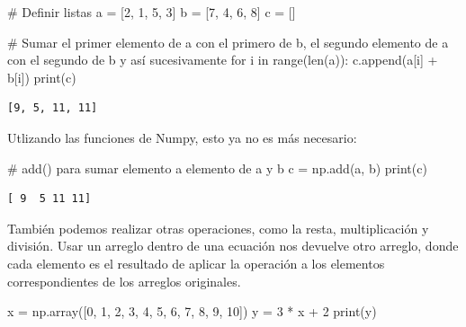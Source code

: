 \documentclass[
  letterpaper,
  DIV=11,
  numbers=noendperiod]{scrreprt}
\newenvironment{Shaded}{\begin{snugshade}}{\end{snugshade}}
\newcommand{\BuiltInTok}[1]{\textcolor[rgb]{0.00,0.23,0.31}{#1}}
\newcommand{\CommentTok}[1]{\textcolor[rgb]{0.37,0.37,0.37}{#1}}
\newcommand{\ControlFlowTok}[1]{\textcolor[rgb]{0.00,0.23,0.31}{#1}}
\newcommand{\DecValTok}[1]{\textcolor[rgb]{0.68,0.00,0.00}{#1}}
\newcommand{\KeywordTok}[1]{\textcolor[rgb]{0.00,0.23,0.31}{#1}}
\newcommand{\NormalTok}[1]{\textcolor[rgb]{0.00,0.23,0.31}{#1}}
\newcommand{\OperatorTok}[1]{\textcolor[rgb]{0.37,0.37,0.37}{#1}}
\begin{document}
\begin{Shaded}
\begin{Highlighting}[]
\CommentTok{\# Definir listas}
\NormalTok{a }\OperatorTok{=}\NormalTok{ [}\DecValTok{2}\NormalTok{, }\DecValTok{1}\NormalTok{, }\DecValTok{5}\NormalTok{, }\DecValTok{3}\NormalTok{]}
\NormalTok{b }\OperatorTok{=}\NormalTok{ [}\DecValTok{7}\NormalTok{, }\DecValTok{4}\NormalTok{, }\DecValTok{6}\NormalTok{, }\DecValTok{8}\NormalTok{]}
\NormalTok{c }\OperatorTok{=}\NormalTok{ []}

\CommentTok{\# Sumar el primer elemento de a con el primero de b, el segundo elemento de a con el segundo de b y así sucesivamente}
\ControlFlowTok{for}\NormalTok{ i }\KeywordTok{in} \BuiltInTok{range}\NormalTok{(}\BuiltInTok{len}\NormalTok{(a)):}
\NormalTok{  c.append(a[i] }\OperatorTok{+}\NormalTok{ b[i])}
\BuiltInTok{print}\NormalTok{(c)}
\end{Highlighting}
\end{Shaded}

\begin{verbatim}
[9, 5, 11, 11]
\end{verbatim}

Utlizando las funciones de Numpy, esto ya no es más necesario:

\begin{Shaded}
\begin{Highlighting}[]
\CommentTok{\# add() para sumar elemento a elemento de a y b}
\NormalTok{c }\OperatorTok{=}\NormalTok{ np.add(a, b)}
\BuiltInTok{print}\NormalTok{(c)}
\end{Highlighting}
\end{Shaded}

\begin{verbatim}
[ 9  5 11 11]
\end{verbatim}

También podemos realizar otras operaciones, como la resta,
multiplicación y división. Usar un arreglo dentro de una ecuación nos
devuelve otro arreglo, donde cada elemento es el resultado de aplicar la
operación a los elementos correspondientes de los arreglos originales.

\begin{Shaded}
\begin{Highlighting}[]
\NormalTok{x }\OperatorTok{=}\NormalTok{ np.array([}\DecValTok{0}\NormalTok{,  }\DecValTok{1}\NormalTok{, }\DecValTok{2}\NormalTok{, }\DecValTok{3}\NormalTok{, }\DecValTok{4}\NormalTok{, }\DecValTok{5}\NormalTok{, }\DecValTok{6}\NormalTok{, }\DecValTok{7}\NormalTok{, }\DecValTok{8}\NormalTok{, }\DecValTok{9}\NormalTok{, }\DecValTok{10}\NormalTok{])}
\NormalTok{y }\OperatorTok{=} \DecValTok{3} \OperatorTok{*}\NormalTok{ x }\OperatorTok{+} \DecValTok{2}
\BuiltInTok{print}\NormalTok{(y)}
\end{Highlighting}
\end{Shaded}
\end{document}
